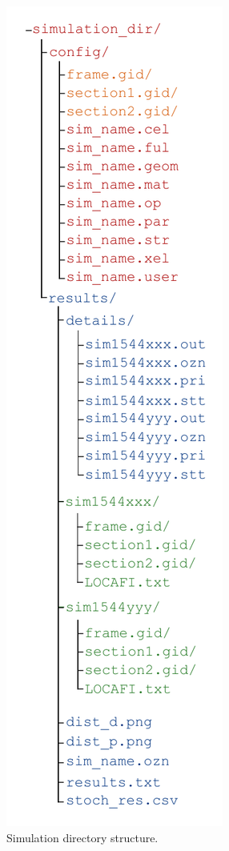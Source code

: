\documentclass[a4paper,11pt]{article}
\begin{document}
\begin{figure}
\begin{center}
\vspace{-20pt}
\includegraphics[scale=0.8]{dir_tree.pdf}
\end{center}
\vspace{-20pt}
\caption{Simulation directory structure.}
\vspace{-10pt}
\label{fig:dir_tree}
\end{figure}
\end{document}
